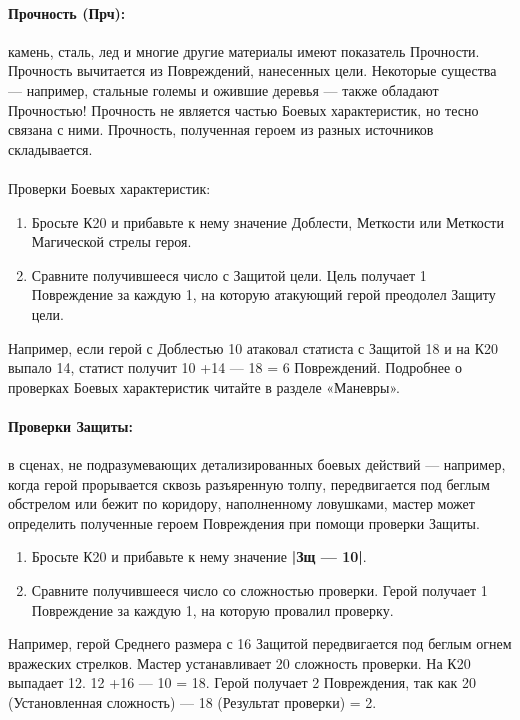 \paragraph{Прочность (Прч):} камень, сталь, лед и многие другие материалы имеют показатель Прочности. Прочность вычитается из Повреждений, нанесенных цели. Некоторые существа — например, стальные големы и ожившие деревья — также обладают Прочностью! Прочность не является частью Боевых характеристик, но тесно связана с ними.
\newline Прочность, полученная героем из разных источников складывается.
\paragraph{}Проверки Боевых характеристик:
\begin{enumerate}
\item Бросьте К20 и прибавьте к нему значение Доблести, Меткости или Меткости Магической стрелы героя.
\item Сравните получившееся число с Защитой цели. Цель получает 1 Повреждение за каждую 1, на которую атакующий герой преодолел Защиту цели.
\end{enumerate}
Например, если герой с Доблестью 10 атаковал статиста с Защитой 18 и на К20 выпало 14, статист получит 10 +14 — 18 = 6 Повреждений.
\newline
Подробнее о проверках Боевых характеристик читайте в разделе «Маневры».
\paragraph{Проверки Защиты:} в сценах, не подразумевающих
детализированных боевых действий — например, когда герой
прорывается сквозь разъяренную толпу, передвигается под беглым обстрелом или бежит по коридору, наполненному ловушками, мастер может определить полученные героем Повреждения при помощи проверки Защиты.
\begin{enumerate}
\item Бросьте К20 и прибавьте к нему значение \textbf{|Зщ — 10|}.
\item Сравните получившееся число со сложностью проверки. Герой получает 1 Повреждение за каждую 1, на которую провалил проверку.
\end{enumerate}
Например, герой Среднего размера с 16 Защитой передвигается
под беглым огнем вражеских стрелков. Мастер устанавливает
20 сложность проверки. На К20 выпадает 12. 12 +16 — 10 = 18.
Герой получает 2 Повреждения, так как 20 (Установленная
сложность) — 18 (Результат проверки) = 2.